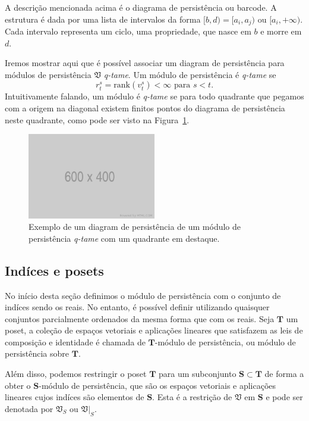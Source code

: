 A descrição mencionada acima é o diagrama de persistência ou barcode. A estrutura é dada por uma 
lista de intervalos da forma $[b,d) = [a_i, a_j)$ ou $[a_i, +\infty)$. Cada intervalo representa
um ciclo, uma propriedade, que nasce em $b$ e morre em $d$. 

Iremos mostrar aqui que é possível associar um diagram de persistência para módulos de 
persistência $\mathfrak{V}$ \textit{q-tame}. Um módulo de persistência é \textit{q-tame} 
se 
\begin{equation*}
    r_t^s = \text{rank}(v_t^s) < \infty \text{ para } s < t.
\end{equation*}
Intuitivamente falando, um módulo é \textit{q-tame} se para todo quadrante que pegamos com a origem
na diagonal existem finitos pontos do diagrama de persistência neste quadrante, como pode ser visto
na Figura~\ref{fig:quad_finito}.

\begin{figure}
    \centering
    \includegraphics[width=0.5\textwidth]{images/placeholder.png}
    \caption{Exemplo de um diagram de persistência de um módulo de 
            persistência \textit{q-tame} com um quadrante em destaque.}
    \label{fig:quad_finito}
    \fautor
\end{figure}

\subsection{Indíces e posets} 
No início desta seção definimos o módulo de persistência com o conjunto de indíces sendo os reais. No 
entanto, é possível definir utilizando quaisquer conjuntos parcialmente ordenados da mesma forma que 
com os reais. Seja $\mathbf{T}$ um poset, a coleção de espaços vetoriais e aplicações lineares que 
satisfazem as leis de composição e identidade é chamada de $\mathbf{T}$-módulo de persistência, ou 
módulo de persistência sobre $\mathbf{T}$. 

Além disso, podemos restringir o poset $\mathbf{T}$ para um subconjunto $\mathbf{S} \subset \mathbf{T}$
de forma a obter o $\mathbf{S}$-módulo de persistência, que são os espaços vetoriais e aplicações lineares
cujos indíces são elementos de $\mathbf{S}$. Esta é a restrição de $\mathfrak{V}$ em $\mathbf{S}$ e pode
ser denotada por $\mathfrak{V}_S$ ou $\left.\mathfrak{V}\right|_S$. 


